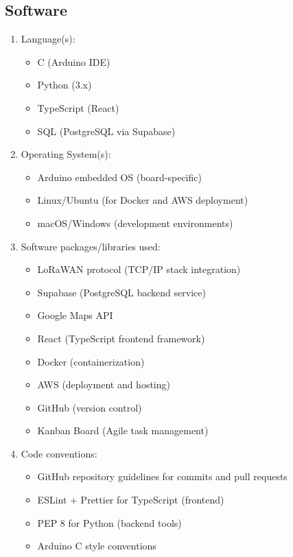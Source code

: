 \subsection{Software}
\begin{enumerate}
\item Language(s): 
  \begin{itemize}
    \item C (Arduino IDE)
    \item Python (3.x)
    \item TypeScript (React)
    \item SQL (PostgreSQL via Supabase)
  \end{itemize}

\item Operating System(s):
  \begin{itemize}
    \item Arduino embedded OS (board-specific)
    \item Linux/Ubuntu (for Docker and AWS deployment)
    \item macOS/Windows (development environments)
  \end{itemize}

\item Software packages/libraries used:
  \begin{itemize}
    \item LoRaWAN protocol (TCP/IP stack integration)
    \item Supabase (PostgreSQL backend service)
    \item Google Maps API
    \item React (TypeScript frontend framework)
    \item Docker (containerization)
    \item AWS (deployment and hosting)
    \item GitHub (version control)
    \item Kanban Board (Agile task management)
  \end{itemize}

\item Code conventions: 
  \begin{itemize}
    \item GitHub repository guidelines for commits and pull requests
    \item ESLint + Prettier for TypeScript (frontend)
    \item PEP 8 for Python (backend tools)
    \item Arduino C style conventions
  \end{itemize}
\end{enumerate}


